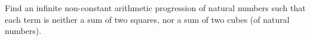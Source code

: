 Find an infinite non-constant arithmetic progression of natural numbers such that each term is neither a sum of two squares, nor a sum of two cubes (of natural numbers).